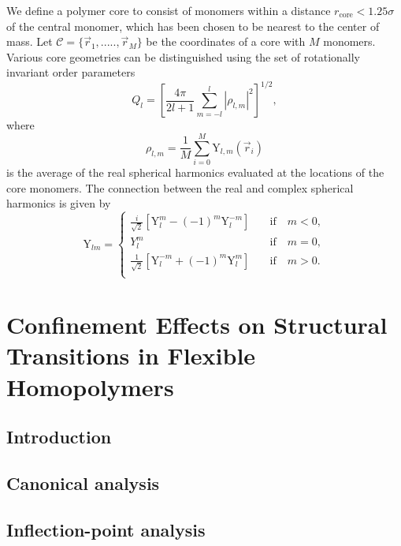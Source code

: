 \documentclass[12pt]{report}
\begin{document}
We define a polymer core to consist of monomers within a
distance $r_{\mathrm{core}} < 1.25\sigma$ of the central monomer, which has
been chosen to be nearest to the center of mass. Let $\mathcal{C} = \lbrace
\vec{r}_{1},.....,\vec{r}_{M} \rbrace $ be the coordinates of a core with
$M$ monomers. Various core geometries can be distinguished using the set of
rotationally invariant order parameters
%
\begin{equation}
Q_{l} =  \left[ \frac{4\pi}{2l + 1} \displaystyle\sum_{m =-l}^{l}
|\rho_{l,m}|^{2} \right]^{1/2},	
\end{equation}
%
where 
\begin{equation}
\rho _{l,m} = \frac{1}{M}\sum _{i = 0} ^{M} \mathrm{Y}_{l,m}(\vec{r}_{i})
\label{eq:15}
\end{equation}
%
is the average of the real spherical harmonics evaluated at the locations
of the core monomers. The connection between the real and complex spherical
harmonics is given by
% 
\begin{equation}
	\mathrm{Y}_{lm} =  \left\{
		\begin{array}{lr}
		\frac{i}{\sqrt{2}}\left[\mathrm{Y}_{l}^{m} -
(-1)^{m}\mathrm{Y}_{l}^{-m}\right] & \quad \mathrm{if} \quad  m < 0,
\\[1.5ex]
		{Y}_{l}^{m} & \quad \mathrm{if} \quad  m = 0, \\[1.5ex]
		\frac{1}{\sqrt{2}}\left[\mathrm{Y}_{l}^{-m} +
(-1)^{m}\mathrm{Y}_{l}^{m}\right] & \quad \mathrm{if} \quad  m > 0. \\
		\end{array}
	\right. 
\end{equation}





\chapter{Confinement Effects on Structural Transitions in Flexible Homopolymers}
\section{Introduction}
\section{Canonical analysis}
\section{Inflection-point analysis}
\end{document}
